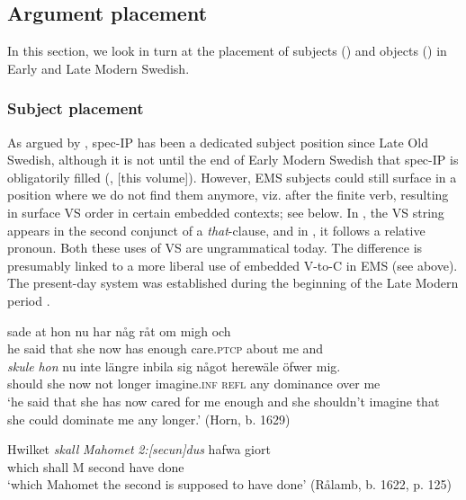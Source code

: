 \documentclass[output=paper]{langscibook}
\begin{document}
\subsection{ Argument placement}\label{sec:intro:3.2}


In this section, we look in turn at the placement of subjects () and objects () in Early and Late Modern Swedish.


\subsubsection{Subject placement}\label{sec:intro:3.2.1}


As argued by \textcite{Hakansson2008}, spec-IP has been a dedicated subject position since Late Old Swedish, although it is not until the end of Early Modern Swedish that spec-IP is obligatorily filled (\citealt{Falk1993}, \citeyear{chapters/02} [this volume]). However, EMS subjects could still surface in a position where we do not find them anymore, viz. after the finite verb, resulting in surface VS order in certain embedded contexts; see  below. In , the VS string appears in the second conjunct of a \textit{that}{}-clause, and in , it follows a relative pronoun. Both these uses of VS are ungrammatical today. The difference is presumably linked to a more liberal use of embedded V-to-C in EMS (see  above). The present-day system was established during the beginning of the Late Modern period \citep{Petzell2013}.


\ea\label{ex:intro:12}
\ea\label{ex:intro:12a}
\gll  [han] sade at     hon   nu   har     någ    råt     om   migh och \\
he   said   that she   now has   enough   care.\textsc{ptcp}   about   me     and\\

\gll  \textit{skule}   \textit{hon} nu   inte längre inbila       sig   något herewäle  öfwer   mig.\\
    should   she   now   not longer   imagine.\textsc{inf}   \textsc{refl}   any   dominance   over   me \\
\glt `he said that she has now cared for me enough and she shouldn’t imagine that she could dominate me any longer.’ (Horn, b. 1629)

\ex\label{ex:intro:12b}
\gll  Hwilket \textit{skall}   \textit{Mahomet} \textit{2:[secun]dus} hafwa   giort \\
      which   shall   M         second       have       done\\
    \glt ‘which Mahomet the second is supposed to have done’ (Rålamb, b. 1622, p. 125)
\z
\z
\end{document}
